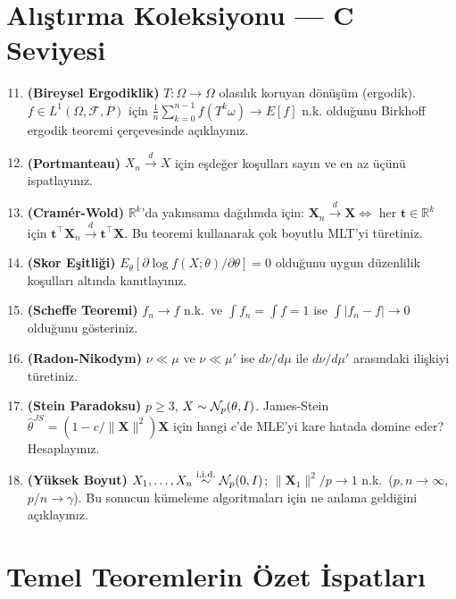 \section{Alıştırma Koleksiyonu --- C Seviyesi}
\label{app:C_seviye}

\begin{enumerate}[label=\textbf{G.\arabic*.}]
\setcounter{enumi}{10}
  \item \textbf{(Bireysel Ergodiklik)} $T:\Omega\to\Omega$ olasılık koruyan dönüşüm (ergodik). $f\in L^1(\Omega,\mathcal{F},P)$ için $\frac{1}{n}\sum_{k=0}^{n-1}f(T^k\omega)\to E[f]$ n.k. olduğunu Birkhoff ergodik teoremi çerçevesinde açıklayınız.
  \item \textbf{(Portmanteau)} $X_n\xrightarrow{d}X$ için eşdeğer koşulları sayın ve en az üçünü ispatlayınız.
  \item \textbf{(Cramér-Wold)} $\mathbb{R}^k$'da yakınsama dağılımda için: $\mathbf{X}_n\xrightarrow{d}\mathbf{X}\iff$ her $\mathbf{t}\in\mathbb{R}^k$ için $\mathbf{t}^\top\mathbf{X}_n\xrightarrow{d}\mathbf{t}^\top\mathbf{X}$. Bu teoremi kullanarak çok boyutlu MLT'yi türetiniz.
  \item \textbf{(Skor Eşitliği)} $E_\theta[\partial\log f(X;\theta)/\partial\theta]=0$ olduğunu uygun düzenlilik koşulları altında kanıtlayınız.
  \item \textbf{(Scheffe Teoremi)} $f_n\to f$ n.k.\ ve $\int f_n=\int f=1$ ise $\int|f_n-f|\to0$ olduğunu gösteriniz.
  \item \textbf{(Radon-Nikodym)} $\nu\ll\mu$ ve $\nu\ll\mu'$ ise $d\nu/d\mu$ ile $d\nu/d\mu'$ arasındaki ilişkiyi türetiniz.
  \item \textbf{(Stein Paradoksu)} $p\geq3$, $X\sim\mathcal{N}_p(\theta,I)$. James-Stein $\hat\theta^{JS}=(1-c/\|\mathbf{X}\|^2)\mathbf{X}$ için hangi $c$'de MLE'yi kare hatada domine eder? Hesaplayınız.
  \item \textbf{(Yüksek Boyut)} $X_1,\ldots,X_n\overset{\text{i.i.d.}}{\sim}\mathcal{N}_p(0,I)$; $\|\mathbf{X}_1\|^2/p\to1$ n.k.\ ($p,n\to\infty$, $p/n\to\gamma$). Bu sonucun kümeleme algoritmaları için ne anlama geldiğini açıklayınız.
\end{enumerate}

\section{Temel Teoremlerin Özet İspatları}
\label{app:ozet_ispatlar}

